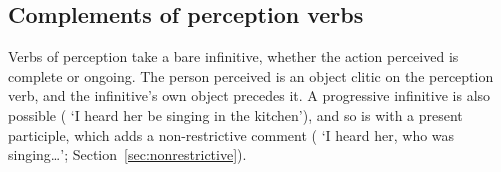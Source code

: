 \subsection{Complements of perception verbs}
Verbs of perception take a bare infinitive, whether the action perceived is complete or ongoing. The person perceived is an object clitic on the perception verb, and the infinitive's own object precedes it.
A progressive infinitive is also possible ( `I heard her be singing in the kitchen'), and so is  with a present participle, which adds a non-restrictive comment ( `I heard her, who was singing\ldots'; Section~\ref{sec:nonrestrictive}).

